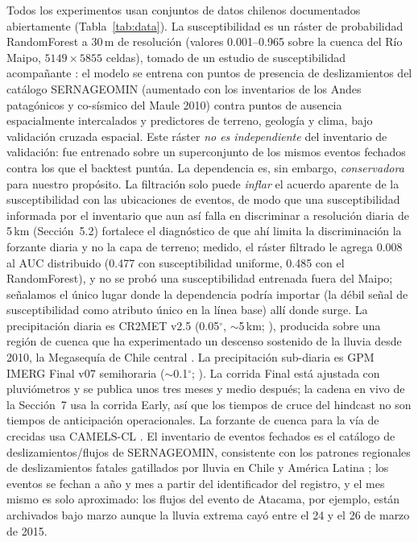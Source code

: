 \documentclass[authoryear,preprint,review,12pt]{elsarticle}
\begin{document}
Todos los experimentos usan conjuntos de datos chilenos documentados abiertamente
(Tabla~\ref{tab:data}). La susceptibilidad es un ráster de probabilidad
RandomForest a 30\,m de resolución (valores 0.001--0.965 sobre la cuenca del Río
Maipo, $5149\times5855$ celdas), tomado de un estudio de susceptibilidad
acompañante \citep{parra2026transfer}: el modelo se entrena con puntos de presencia de deslizamientos del
catálogo SERNAGEOMIN (aumentado con los inventarios de los Andes patagónicos y
co-sísmico del Maule 2010) contra puntos de ausencia espacialmente intercalados y
predictores de terreno, geología y clima, bajo validación cruzada espacial. Este
ráster \emph{no es independiente} del inventario de validación: fue entrenado
sobre un superconjunto de los mismos eventos fechados contra los que el backtest
puntúa. La dependencia es, sin embargo, \emph{conservadora} para nuestro
propósito. La filtración solo puede \emph{inflar} el acuerdo aparente de la
susceptibilidad con las ubicaciones de eventos, de modo que una susceptibilidad
informada por el inventario que aun así falla en discriminar a resolución diaria
de 5\,km (Sección~5.2) fortalece el diagnóstico de que ahí limita la discriminación la
forzante diaria y no la capa de terreno; medido, el ráster filtrado le agrega 0.008 al
AUC distribuido (0.477 con susceptibilidad uniforme, 0.485 con el RandomForest), y no
se probó una susceptibilidad entrenada fuera del Maipo; señalamos el único lugar donde la dependencia podría importar (la
débil señal de susceptibilidad como atributo único en la línea base) allí donde
surge. La precipitación diaria es CR2MET v2.5 (0.05$^\circ$, $\sim$5\,km;
\citealp{boisier2018cr2met,boisier2023cr2met}), producida sobre una región de cuenca que ha
experimentado un descenso sostenido de la lluvia desde 2010, la Megasequía de
Chile central \citep{garreaud2019,boisier2018}. La precipitación sub-diaria es GPM
IMERG Final v07 semihoraria ($\sim$0.1$^\circ$; \citealp{huffman2023,tan2019}). La
corrida Final está ajustada con pluviómetros y se publica unos tres meses y medio
después; la cadena en vivo de la Sección~7 usa la corrida Early, así que los tiempos
de cruce del hindcast no son tiempos de anticipación operacionales. La
forzante de cuenca para la vía de crecidas usa CAMELS-CL \citep{alvarez2018}. El
inventario de eventos fechados es el catálogo de deslizamientos/flujos de
SERNAGEOMIN, consistente con los patrones regionales de deslizamientos fatales
gatillados por lluvia en Chile y América Latina \citep{sepulveda2015}; los eventos
se fechan a año y mes a partir del identificador del registro, y el mes mismo es
solo aproximado: los flujos del evento de Atacama, por ejemplo, están archivados
bajo marzo aunque la lluvia extrema cayó entre el 24 y el 26 de marzo de 2015.
\end{document}
